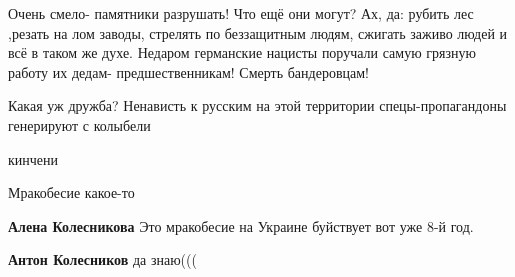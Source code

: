 \begin{itemize}
Очень смело- памятники разрушать! Что ещё они могут? Ах, да: рубить лес ,резать
на лом заводы, стрелять по беззащитным людям, сжигать заживо людей и всё в таком
же духе. Недаром германские нацисты поручали самую грязную работу их дедам-
предшественникам! Смерть бандеровцам!

 
Какая уж дружба? Ненависть к русским на этой территории спецы-пропагандоны
генерируют с колыбели

 
кинчени

 
Мракобесие какое-то

\begin{itemize}
 
\textbf{Алена Колесникова} Это мракобесие на Украине буйствует вот уже 8-й год.

 
\textbf{Антон Колесников} да знаю(((
\end{itemize}

 

\end{itemize}

